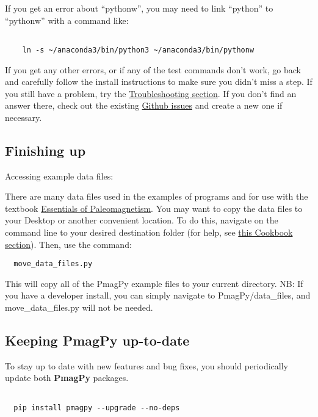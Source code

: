 \documentclass[11pt]{article}
\begin{document}
If you get an error about ``pythonw'', you may need to link ``python'' to ``pythonw'' with a command like:

  \begin{verbatim}

    ln -s ~/anaconda3/bin/python3 ~/anaconda3/bin/pythonw

    \end{verbatim}

If you get any other errors, or if any of the test commands don't work, go back and carefully follow the install instructions to make sure you didn't miss a step.  If you still have a problem, try the \href{https://earthref.org/PmagPy/cookbook/#trouble}{Troubleshooting section}.  If you don't find an answer there, check out the existing \href{https://github.com/PmagPy/PmagPy/issues}{Github issues} and create a new one if necessary.


\subsection{Finishing up}

Accessing example data files:

   There are many data files used in the examples of programs and for use with the textbook  \href{http://earthref.org/MAGIC/books/Tauxe/Essentials/WebBook3.html}{Essentials of Paleomagnetism}.     You may want to copy  the data files to your Desktop or another convenient location.
   To do this, navigate on the command line to your desired destination folder (for help, see \href{https://earthref.org/PmagPy/cookbook/#file_system}{this Cookbook section}).  Then, use the command:

\begin{verbatim}
  move_data_files.py
\end{verbatim}

This will copy all of the PmagPy example files to your current directory.  NB: If you have a developer install, you can simply navigate to PmagPy/data\_files, and move\_data\_files.py will not be needed.


\subsection{Keeping PmagPy up-to-date}


To stay up to date with new features and bug fixes, you should periodically update both {\bf PmagPy} packages.
\begin{verbatim}

  pip install pmagpy --upgrade --no-deps
\end{verbatim}
\end{document}
